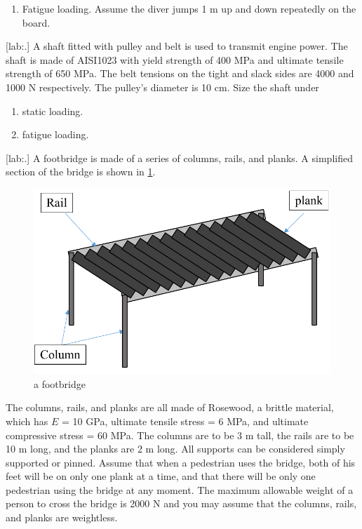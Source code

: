 \documentclass[a4paper,openany,nobib]{tufte-book}
\begin{document}
{{\begin{enumerate}
\item Fatigue loading. Assume the diver jumps 1 m up and down repeatedly on
the board.
\end{enumerate}

[lab:.] A shaft fitted with pulley
and belt is used to transmit engine power. The shaft is made of AISI1023
with yield strength of 400 MPa and ultimate tensile strength of 650 MPa.
The belt tensions on the tight and slack sides are 4000 and 1000 N
respectively. The pulley's diameter is 10 cm. Size the shaft under



\begin{enumerate}
\item static loading.

\item fatigue loading.
\end{enumerate}

[lab:.] A
footbridge is made of a series of columns, rails, and planks. A
simplified section of the bridge is shown in
\ref{fig: footbridge exercise}.


\begin{figure}[htbp]
\centering
\includegraphics[width=.9\linewidth]{pictures/Simple-load-bearing/footbridge.pdf}
\caption{\label{fig: footbridge exercise}a footbridge}
\end{figure}

The columns, rails, and planks are all made of Rosewood, a brittle
material, which has \(E\) = 10 GPa, ultimate tensile stress = 6 MPa, and
ultimate compressive stress = 60 MPa. The columns are to be 3 m tall,
the rails are to be 10 m long, and the planks are 2 m long. All supports
can be considered simply supported or pinned. Assume that when a
pedestrian uses the bridge, both of his feet will be on only one plank
at a time, and that there will be only one pedestrian using the bridge
at any moment. The maximum allowable weight of a person to cross the
bridge is 2000 N and you may assume that the columns, rails, and planks
are weightless.

}}
\end{document}
